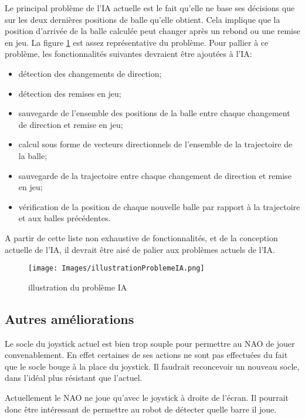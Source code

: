     \par Le principal problème de l'IA actuelle est le fait qu'elle ne base ses décisions que sur les deux dernières positions de balle qu'elle obtient.
    Cela implique que la position d'arrivée de la balle calculée peut changer après un rebond ou une remise en jeu.
    La figure \ref{fig:illustration du problème IA} est assez représentative du problème.
    Pour pallier à ce problème, les fonctionnalités suivantes devraient être ajoutées à l'IA:
    \begin{itemize}
      \item détection des changements de direction;
      \item détection des remises en jeu;
      \item sauvegarde de l'ensemble des positions de la balle entre chaque changement de direction et remise en jeu;
      \item calcul sous forme de vecteurs directionnels de l'ensemble de la trajectoire de la balle;
      \item sauvegarde de la trajectoire entre chaque changement de direction et remise en jeu;
      \item vérification de la position de chaque nouvelle balle par rapport à la trajectoire et aux balles précédentes.
    \end{itemize}
    A partir de cette liste non exhaustive de fonctionnalités, et de la conception actuelle de l'IA, il devrait être aisé de palier aux problèmes actuels de l'IA.

    \begin{figure}[!h]
      \caption{illustration du problème IA}
      \label{fig:illustration du problème IA}
      \centering
      \texttt{[image: Images/illustrationProblemeIA.png]}
    \end{figure}


  \subsection{Autres améliorations}
  \label{sub:Autres améliorations}
    \par Le socle du joystick actuel est bien trop souple pour permettre au NAO de jouer convenablement.
    En effet certaines de ses actions ne sont pas effectuées du fait que le socle bouge à la place du joystick.
    Il faudrait reconcevoir un nouveau socle, dans l'idéal plus résistant que l'actuel.

    \par Actuellement le NAO ne joue qu'avec le joystick à droite de l'écran.
    Il pourrait donc être intéressant de permettre au robot de détecter quelle barre il joue.


